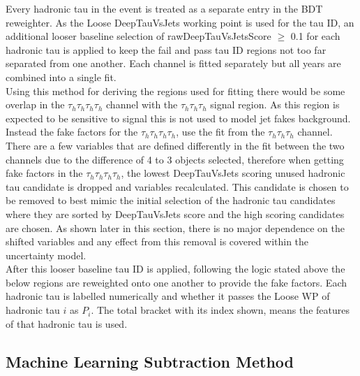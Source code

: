 Every hadronic tau in the event is treated as a separate entry in the BDT reweighter. As the Loose DeepTauVsJets working point is used for the tau ID, an additional looser baseline selection of rawDeepTauVsJetsScore $\geq$ 0.1 for each hadronic tau is applied to keep the fail and pass tau ID regions not too far separated from one another. Each channel is fitted separately but all years are combined into a single fit. \\

Using this method for deriving the regions used for fitting there would be some overlap in the $\tau_h \tau_h \tau_h \tau_h$ channel with the $\tau_h \tau_h \tau_h$ signal region. As this region is expected to be sensitive to signal this is not used to model jet fakes background. Instead the fake factors for the $\tau_h \tau_h \tau_h \tau_h$, use the fit from the $\tau_h \tau_h \tau_h$ channel. There are a few variables that are defined differently in the fit between the two channels due to the difference of 4 to 3 objects selected, therefore when getting fake factors in the $\tau_h \tau_h \tau_h \tau_h$, the lowest DeepTauVsJets scoring unused hadronic tau candidate is dropped and variables recalculated. This candidate is chosen to be removed to best mimic the initial selection of the hadronic tau candidates where they are sorted by DeepTauVsJets score and the high scoring candidates are chosen. As shown later in this section, there is no major dependence on the shifted variables and any effect from this removal is covered within the uncertainty model. \\

After this looser baseline tau ID is applied, following the logic stated above the below regions are reweighted onto one another to provide the fake factors. Each hadronic tau is labelled numerically and whether it passes the Loose WP of hadronic tau $i$ as $P_{i}$. The total bracket with its index shown, means the features of that hadronic tau is used. \\

\subsection{Machine Learning Subtraction Method}


